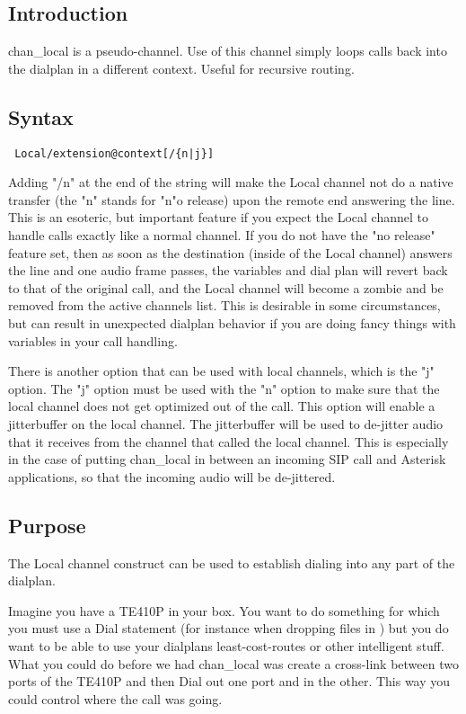 \subsection{Introduction}

chan\_local is a pseudo-channel. Use of this channel simply loops calls back
into the dialplan in a different context. Useful for recursive routing.

\subsection{Syntax}
\begin{verbatim}
 Local/extension@context[/{n|j}]
\end{verbatim}

Adding "/n" at the end of the string will make the Local channel not do a
native transfer (the "n" stands for "n"o release) upon the remote end answering
the line. This is an esoteric, but important feature if you expect the Local
channel to handle calls exactly like a normal channel. If you do not have the
"no release" feature set, then as soon as the destination (inside of the Local
channel) answers the line and one audio frame passes, the variables and dial plan
will revert back to that of the original call, and the Local channel will become a
zombie and be removed from the active channels list. This is desirable in some
circumstances, but can result in unexpected dialplan behavior if you are doing
fancy things with variables in your call handling.

There is another option that can be used with local channels, which is the "j"
option.  The "j" option must be used with the "n" option to make sure that the
local channel does not get optimized out of the call.  This option will enable
a jitterbuffer on the local channel.  The jitterbuffer will be used to de-jitter
audio that it receives from the channel that called the local channel.  This is
especially in the case of putting chan\_local in between an incoming SIP call
and Asterisk applications, so that the incoming audio will be de-jittered.

\subsection{Purpose}

The Local channel construct can be used to establish dialing into any part of
the dialplan.

Imagine you have a TE410P in your box. You want to do something for which you
must use a Dial statement (for instance when dropping files in
) but you do want to be able to use your dialplans
least-cost-routes or other intelligent stuff. What you could do before we had
chan\_local was create a cross-link between two ports of the TE410P and then
Dial out one port and in the other. This way you could control where the call
was going.

